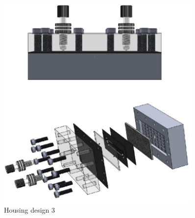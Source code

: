 \begin{figure}[h]%
\centering
\includegraphics[width=0.9\textwidth]{figures/appendix/housingdesign3ass}%
\caption{Housing design 3}%
\label{housingdesign3ass}%
\end{figure}

\clearpage

